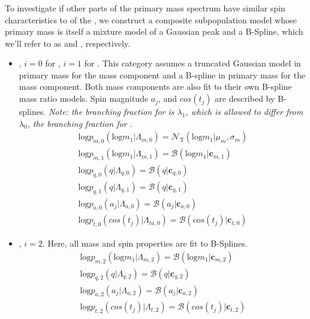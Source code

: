 \subsubsection{\comp{}}

To investigate if other parts of the primary mass spectrum have similar spin characteristics to \popA{} of the \base{}, we construct a composite subpopulation model whose primary mass is itself a mixture model of a Gaussian peak and a B-Spline, which we'll refer to as \first{} and \contA{}, respectively. 



\begin{itemize}
    \item \popA{}, $i=0$ for \first{}, $i=1$ for \contA{}. This category assumes a truncated Gaussian model in primary mass for the \first{} mass component and a B-spline in primary mass for the \contA{} mass component. Both mass components are also fit to their own B-spline mass ratio models. Spin magnitude $a_j$, and $cos(t_{j})$ are described by B-splines. \textit{Note: the branching fraction for \contA{} is $\lambda_1$, which is allowed to differ from $\lambda_0$, the branching fraction for \first{}.}
    \begin{eqnarray} \label{eq:peakAcomp}
        \text{log} p_{m,0}(\text{log} m_1| \Lambda_{m,0}) = \mathcal{N}_\text{T}(\text{log}m_1 | \mu_{m}, \sigma_{m}) \\
        \text{log} p_{m,1}(\text{log} m_1| \Lambda_{m,1}) = \mathcal{B}(\text{log} m_1 | \mathbf{c}_{m, 1}) \\
        \text{log} p_{q,0}(q| \Lambda_{q,0}) = \mathcal{B}(q | \mathbf{c}_{q,0}) \\
        \text{log} p_{q,1}(q| \Lambda_{q,1}) = \mathcal{B}(q | \mathbf{c}_{q,1}) \\
        \text{log} p_{a,0}(a_j| \Lambda_{a,0}) = \mathcal{B}(a_j | \mathbf{c}_{a,0}) \\
        \text{log} p_{t,0}(cos(t_j)| \Lambda_{ta,0}) = \mathcal{B}( cos(t_j) | \mathbf{c}_{t,0})
    \end{eqnarray}

    \item \popB{}, $i=2$. Here, all mass and spin properties are fit to B-Splines.
    \begin{eqnarray} \label{eq:contBcomp}
        \text{log} p_{m,2}(\text{log}m_1| \Lambda_{m,2}) = \mathcal{B}(\text{log}m_1 | \mathbf{c}_{m, 2}) \\
        \text{log} p_{q,2}(q| \Lambda_{q,2}) = \mathcal{B}(q | \mathbf{c}_{q,2}) \\
        \text{log} p_{a,2}(a_j| \Lambda_{a,2}) = \mathcal{B}(a_j | \mathbf{c}_{a,2}) \\
        \text{log} p_{t,2}(cos(t_j)| \Lambda_{t,2}) = \mathcal{B}( cos(t_j) | \mathbf{c}_{t,2})
    \end{eqnarray}
\end{itemize}